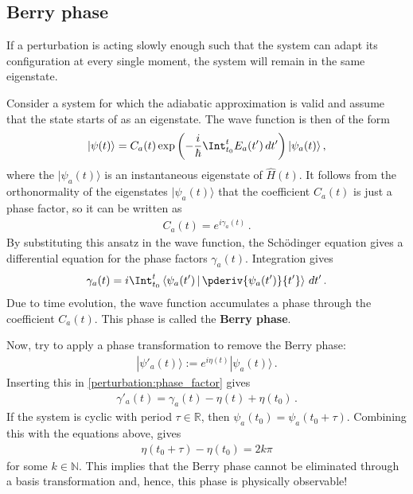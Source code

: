 \subsection{Berry phase}

    \begin{theorem}
        If a perturbation is acting slowly enough such that the system can adapt its configuration at every single moment, the system will remain in the same eigenstate.
    \end{theorem}

    Consider a system for which the adiabatic approximation is valid and assume that the state starts of as an eigenstate. The wave function is then of the form
    \begin{gather}
        |\psi(t)\rangle = C_a(t)\exp\left(-\frac{i}{\hbar}\Int_{t_0}^tE_a(t')\,dt'\right)|\psi_a(t)\rangle\,,
    \end{gather}
    where the $|\psi_a(t)\rangle$ is an instantaneous eigenstate of $\widehat{H}(t)$. It follows from the orthonormality of the eigenstates $|\psi_a(t)\rangle$ that the coefficient $C_a(t)$ is just a phase factor, so it can be written as
    \begin{gather}
        C_a(t) = e^{i\gamma_a(t)}\,.
    \end{gather}
    By substituting this ansatz in the wave function, the Sch\"odinger equation gives a differential equation for the phase factors $\gamma_a(t)$. Integration gives
    \begin{gather}
        \label{perturbation:phase_factor}
        \gamma_a(t) = i\Int_{t_0}^t\left\langle\psi_a(t')\,\middle\vert\,\pderiv{\psi_a(t')}{t'}\right\rangle\,dt'\,.
    \end{gather}
    Due to time evolution, the wave function accumulates a phase through the coefficient $C_a(t)$. This phase is called the \textbf{Berry phase}.

    Now, try to apply a phase transformation to remove the Berry phase:
    \begin{gather}
        \label{perturbation:phase_transform}
        |\psi'_a(t)\rangle := e^{i\eta(t)}|\psi_a(t)\rangle\,.
    \end{gather}
    Inserting this in \cref{perturbation:phase_factor} gives
    \begin{gather}
        \gamma'_a(t) = \gamma_a(t) - \eta(t) + \eta(t_0)\,.
    \end{gather}
    If the system is cyclic with period $\tau\in\mathbb{R}$, then $\psi_a(t_0) = \psi_a(t_0+\tau)$. Combining this with the equations above, gives
    \begin{gather}
        \eta(t_0+\tau) - \eta(t_0) = 2k\pi
    \end{gather}
    for some $k\in\mathbb{N}$. This implies that the Berry phase cannot be eliminated through a basis transformation and, hence, this phase is physically observable!

